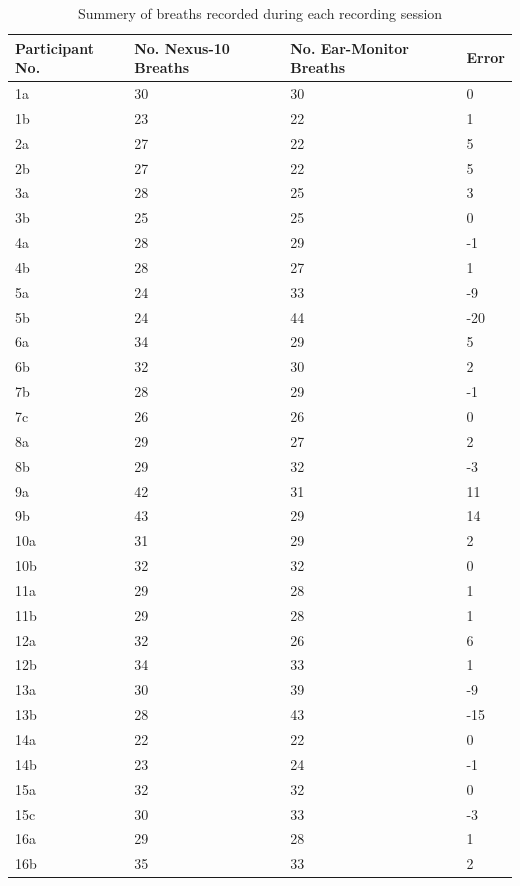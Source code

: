 \begin{table}[H]
\caption{Summery of breaths recorded during each recording session}
\label{tab:RSP_Data}
\centering
\begin{tabular}{|P{1.9cm}|P{3.2cm}|P{3.2cm}|P{1.2cm}|} 
\hline
Participant No.	&	No. Nexus-10 Breaths	&	No. Ear-Monitor Breaths	&	Error	\\
\hline
1a	&	30	&	30	&	0	\\
1b	&	23	&	22	&	1	\\
2a	&	27	&	22	&	5	\\
2b	&	27	&	22	&	5	\\
3a	&	28	&	25	&	3	\\
3b	&	25	&	25	&	0	\\
4a	&	28	&	29	&	-1	\\
4b	&	28	&	27	&	1	\\
5a	&	24	&	33	&	-9	\\
5b	&	24	&	44	&	-20	\\
6a	&	34	&	29	&	5	\\
6b	&	32	&	30	&	2	\\
7b	&	28	&	29	&	-1	\\
7c	&	26	&	26	&	0	\\
8a	&	29	&	27	&	2	\\
8b	&	29	&	32	&	-3	\\
9a	&	42	&	31	&	11	\\
9b	&	43	&	29	&	14	\\
10a	&	31	&	29	&	2	\\
10b	&	32	&	32	&	0	\\
11a	&	29	&	28	&	1	\\
11b	&	29	&	28	&	1	\\
12a	&	32	&	26	&	6	\\
12b	&	34	&	33	&	1	\\
13a	&	30	&	39	&	-9	\\
13b	&	28	&	43	&	-15	\\
14a	&	22	&	22	&	0	\\
14b	&	23	&	24	&	-1	\\
15a	&	32	&	32	&	0	\\
15c	&	30	&	33	&	-3	\\
16a	&	29	&	28	&	1	\\
16b	&	35	&	33	&	2	\\
\hline
\end{tabular}
\end{table}

